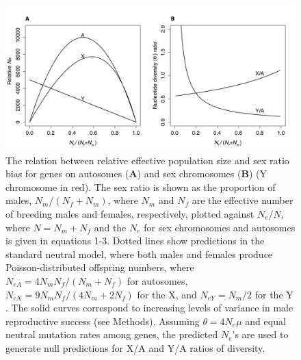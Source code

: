 \documentclass[9pt,twocolumn,twoside]{gsajnl}
\begin{document}
\begin{figure}[htbp]
\centering
\includegraphics[width=\linewidth]{Figure1.png}
\caption{The relation between relative effective population size and sex ratio bias for genes on autosomes (\textbf{A}) and sex chromosomes (\textbf{B}) (Y chromosome in red). The sex ratio is shown as the proportion of males, $N_{m}/(N_{f}+N_{m})$, where $N_{m}$ and $N_{f}$ are the effective number of breeding males and females, respectively, plotted against $N_{e}/N$, where $N=N_{m}+N_{f}$ and the $N_{e}$ for sex chromosomes and autosomes is given in equations 1-3. Dotted lines show predictions in the standard neutral model, where both males and females produce Poisson-distributed offspring numbers, where $N_{e{A}}=4N_{m}N_{f}/(N_{m}+N_{f})$ for autosomes, $N_{e{X}}=9N_{m}N_{f}/(4N_{m}+2N_{f})$ for the X, and $N_{e{Y}}=N_{m}/2$ for the Y \citep{wright1931evolution}. The solid curves correspond to increasing levels of variance in male reproductive success \citep{nomura2002effective} (see Methods). Assuming $\theta=4N_{e}\mu$ and equal neutral mutation rates among genes, the predicted $N_{e}$'s are used to generate null predictions for X/A and Y/A ratios of diversity.  
}%
\label{fig:spectrum}
\end{figure}
\end{document}
